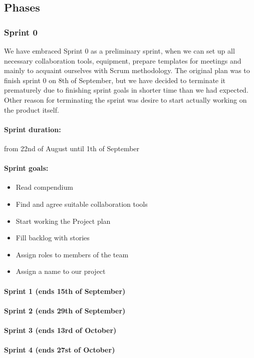 \documentclass{report}
\begin{document}
\subsection{Phases}
\subsubsection{Sprint 0}
We have embraced Sprint 0 as a preliminary sprint, when we can set up all necessary collaboration tools, equipment, prepare templates for meetings and mainly to acquaint ourselves with Scrum methodology. The original plan was to finish sprint 0 on 8th of September, but we have decided to terminate it prematurely due to finishing sprint goals in shorter time than we had expected. Other reason for terminating the sprint was desire to start actually working on the product itself.

\paragraph{Sprint duration:} from 22nd of August until 1th of September
\paragraph{Sprint goals:}
\begin{itemize}
    \item Read compendium
    \item Find and agree suitable collaboration tools
    \item Start working the Project plan
    \item Fill backlog with stories
    \item Assign roles to members of the team
    \item Assign a name to our project
\end{itemize}



\paragraph{Sprint 1 (ends 15th of September)}
\paragraph{Sprint 2 (ends 29th of September)}
\paragraph{Sprint 3 (ends 13rd of October)}
\paragraph{Sprint 4 (ends 27st of October)}
\end{document}
